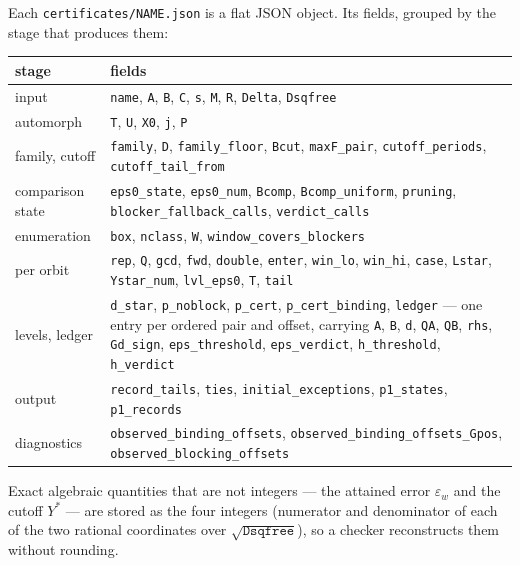 \documentclass[11pt]{article}
\theoremstyle{definition}
\theoremstyle{remark}
\newcommand{\epsw}{\varepsilon_w}
\begin{document}
Each \texttt{certificates/NAME.json} is a flat JSON object. Its fields, grouped by the stage
that produces them:

\begin{center}\footnotesize
\setlength{\tabcolsep}{4pt}
\begin{tabular}{@{}>{\raggedright\arraybackslash}p{2.6cm}>{\raggedright\arraybackslash}p{11.3cm}@{}}
\toprule
stage & fields \\
\midrule
input &
\texttt{name}, \texttt{A}, \texttt{B}, \texttt{C}, \texttt{s}, \texttt{M}, \texttt{R},
\texttt{Delta}, \texttt{Dsqfree} \\
automorph &
\texttt{T}, \texttt{U}, \texttt{X0}, \texttt{j}, \texttt{P} \\
family, cutoff &
\texttt{family}, \texttt{D}, \texttt{family\_floor}, \texttt{Bcut}, \texttt{maxF\_pair},
\texttt{cutoff\_periods}, \texttt{cutoff\_tail\_from} \\
comparison state &
\texttt{eps0\_state}, \texttt{eps0\_num}, \texttt{Bcomp}, \texttt{Bcomp\_uniform},
\texttt{pruning}, \texttt{blocker\_fallback\_calls}, \texttt{verdict\_calls} \\
enumeration &
\texttt{box}, \texttt{nclass}, \texttt{W}, \texttt{window\_covers\_blockers} \\
per orbit &
\texttt{rep}, \texttt{Q}, \texttt{gcd}, \texttt{fwd}, \texttt{double}, \texttt{enter},
\texttt{win\_lo}, \texttt{win\_hi}, \texttt{case}, \texttt{Lstar}, \texttt{Ystar\_num},
\texttt{lvl\_eps0}, \texttt{T}, \texttt{tail} \\
levels, ledger &
\texttt{d\_star}, \texttt{p\_noblock}, \texttt{p\_cert}, \texttt{p\_cert\_binding},
\texttt{ledger} --- one entry per ordered pair and offset, carrying \texttt{A}, \texttt{B},
\texttt{d}, \texttt{QA}, \texttt{QB}, \texttt{rhs}, \texttt{Gd\_sign},
\texttt{eps\_threshold}, \texttt{eps\_verdict}, \texttt{h\_threshold},
\texttt{h\_verdict} \\
output &
\texttt{record\_tails}, \texttt{ties}, \texttt{initial\_exceptions}, \texttt{p1\_states},
\texttt{p1\_records} \\
diagnostics &
\texttt{observed\_binding\_offsets}, \texttt{observed\_binding\_offsets\_Gpos},
\texttt{observed\_blocking\_offsets} \\
\bottomrule
\end{tabular}
\end{center}

Exact algebraic quantities that are not integers --- the attained error $\epsw$ and the cutoff
$Y^{*}$ --- are stored as the four integers (numerator and denominator of each of the two
rational coordinates over $\sqrt{\texttt{Dsqfree}}$), so a checker reconstructs them without
rounding.
\end{document}

